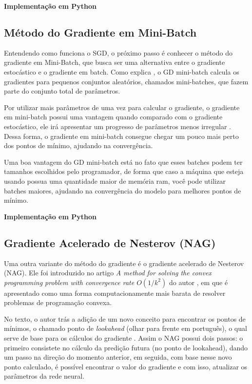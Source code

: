 \textbf{Implementação em Python}

\subsection{Método do Gradiente em Mini-Batch}

Entendendo como funciona o SGD, o próximo passo é conhecer o método do gradiente em Mini-Batch, que busca ser uma alternativa entre o gradiente estocástico e o gradiente em batch. Como explica \textcite{MaosAObra}, o GD mini-batch calcula os gradientes para pequenos conjuntos aleatórios, chamados mini-batches, que fazem parte do conjunto total de parâmetros.

Por utilizar mais parâmetros de uma vez para calcular o gradiente, o gradiente em mini-batch possui uma vantagem quando comparado com o gradiente estocástico, ele irá apresentar um progresso de parâmetros menos irregular \parencite{MaosAObra}. Dessa forma, o gradiente em mini-batch consegue chegar um pouco mais perto dos pontos de mínimo, ajudando na convergência.

Uma boa vantagem do GD mini-batch está no fato que esses batches podem ter tamanhos escolhidos pelo programador, de forma que caso a máquina que esteja usando possua uma quantidade maior de memória ram, você pode utilizar batches maiores, ajudando na convergência do modelo para melhores pontos de mínimo.

\textbf{Implementação em Python}

\subsection{Gradiente Acelerado de Nesterov (NAG)}

Uma outra variante do método do gradiente é o gradiente acelerado de Nesterov (NAG). Ele foi introduzido no artigo \textit{A method for solving the convex programming problem with convergence rate $O(1/k^2)$} do autor \textcite{NAGMethod}, em que é apresentado como uma forma computacionamente mais barata de resolver problemas de programação convexa. 

No texto, o autor trás a adição de um novo conceito para encontrar os pontos de mínimos, o chamado ponto de \textit{lookahead} (olhar para frente em português), o qual serve de base para os cálculos do gradiente \parencite{NAGMethod}. Assim o NAG possui dois passos: o primeiro consistete no cálculo da predição futura (no ponto de lookahead), dando um passo na direção do momento anterior, em seguida, com base nesse novo ponto calculado, é possível encontrar o valor do gradiente e com isso, atualizar os parâmetros da rede neural.


